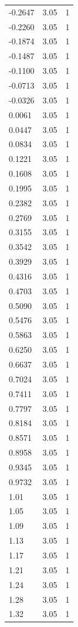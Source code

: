 \begin{longtable}{lrr}
  -0.2647 & 3.05 & 1 \\
  -0.2260 & 3.05 & 1 \\
  -0.1874 & 3.05 & 1 \\
  -0.1487 & 3.05 & 1 \\
  -0.1100 & 3.05 & 1 \\
  -0.0713 & 3.05 & 1 \\
  -0.0326 & 3.05 & 1 \\
  0.0061 & 3.05 & 1 \\
  0.0447 & 3.05 & 1 \\
  0.0834 & 3.05 & 1 \\
  0.1221 & 3.05 & 1 \\
  0.1608 & 3.05 & 1 \\
  0.1995 & 3.05 & 1 \\
  0.2382 & 3.05 & 1 \\
  0.2769 & 3.05 & 1 \\
  0.3155 & 3.05 & 1 \\
  0.3542 & 3.05 & 1 \\
  0.3929 & 3.05 & 1 \\
  0.4316 & 3.05 & 1 \\
  0.4703 & 3.05 & 1 \\
  0.5090 & 3.05 & 1 \\
  0.5476 & 3.05 & 1 \\
  0.5863 & 3.05 & 1 \\
  0.6250 & 3.05 & 1 \\
  0.6637 & 3.05 & 1 \\
  0.7024 & 3.05 & 1 \\
  0.7411 & 3.05 & 1 \\
  0.7797 & 3.05 & 1 \\
  0.8184 & 3.05 & 1 \\
  0.8571 & 3.05 & 1 \\
  0.8958 & 3.05 & 1 \\
  0.9345 & 3.05 & 1 \\
  0.9732 & 3.05 & 1 \\
  1.01 & 3.05 & 1 \\
  1.05 & 3.05 & 1 \\
  1.09 & 3.05 & 1 \\
  1.13 & 3.05 & 1 \\
  1.17 & 3.05 & 1 \\
  1.21 & 3.05 & 1 \\
  1.24 & 3.05 & 1 \\
  1.28 & 3.05 & 1 \\
  1.32 & 3.05 & 1 \\

\end{longtable}
